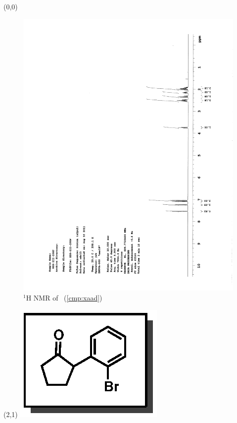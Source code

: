 \begin{textblock}{20}(0,0)
\begin{figure}[htb]
\caption{$^1$H NMR of \CMPxaad\ (\ref{cmp:xaad})}
\includegraphics[scale=0.75, trim = 0mm 0mm 0mm 5mm,
clip]{chp_asymmetric/images/nmr/xaadH}
\vspace{-100pt}
\end{figure}
\end{textblock}
\begin{textblock}{1}(2,1)
\includegraphics[scale=0.8, angle=90]{chp_asymmetric/images/xaad}
\end{textblock}
